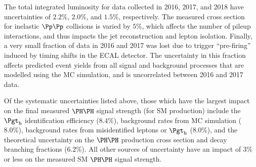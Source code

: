 The total integrated luminosity for data collected in 2016, 2017, and 2018
have uncertainties of $2.2\%$, $2.0\%$, and $1.5\%$, respectively. %
The measured cross section for inelastic $\Pp\Pp$ collisions is varied by
$5\%$, which affects the number of pileup interactions, and thus impacts the
jet reconstruction and lepton isolation. %
Finally, a very small fraction of data in 2016 and 2017 was lost due to
trigger ``pre-firing'' induced by timing shifts in the ECAL detector.
The uncertainty in this fraction affects predicted event yields from
all signal and background processes that are modelled using the MC simulation, and is uncorrelated between 2016
and 2017 data. %

Of the systematic uncertainties listed above, those which have the largest
impact on the final measured $\HH$ signal strength (for SM production)
include the $\tauh$ identification efficiency ($8.4\%$), background rates
from MC simulation ($8.0\%$), background rates from misidentified leptons
or $\tauh$ ($8.0\%$), and the theoretical uncertainty on the $\HH$ production
cross section and decay branching fractions ($6.2\%$).
All other sources of uncertainty have an impact of $3\%$ or less on
the measured SM $\HH$ signal strength.
